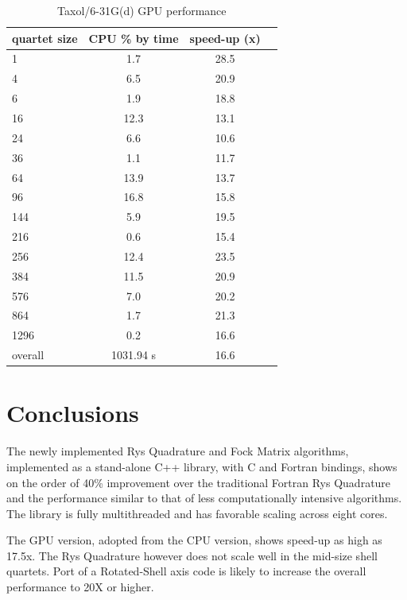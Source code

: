 \documentclass[12pt]{article}
\begin{document}
\begin{table}
  \label{results4}
  \caption {Taxol/6-31G(d) GPU performance}
  \begin{center}
    \begin{tabular}{| l | c | c | c |}
      \hline
      quartet size & CPU \% by time  &  speed-up (x) \\
      \hline
      1 & 1.7 & 28.5 \\
      4 & 6.5 & 20.9 \\
      6 & 1.9 & 18.8 \\
      16 & 12.3 & 13.1 \\
      24 & 6.6 & 10.6 \\
      36 & 1.1 & 11.7 \\
      64 & 13.9 & 13.7 \\
      96 & 16.8 & 15.8 \\
      144 & 5.9 & 19.5 \\
      216 & 0.6 & 15.4 \\
      256 & 12.4 & 23.5 \\
      384 & 11.5 & 20.9 \\
      576 & 7.0 & 20.2 \\
      864 & 1.7 & 21.3 \\
      1296 & 0.2 & 16.6 \\
      \hline
      overall & 1031.94 s &  16.6 \\
      \hline
    \end{tabular}
  \end{center}
\end{table}


\section*{Conclusions}
The newly implemented Rys Quadrature and Fock Matrix  algorithms,
implemented as a stand-alone C++ library, with C and Fortran bindings,
shows on the order of  40\% improvement over the traditional Fortran
Rys Quadrature and the performance similar to that of less
computationally intensive algorithms.  The library is fully
multithreaded and has favorable scaling across eight cores.

The GPU version, adopted from the CPU version, shows speed-up as high
as 17.5x.  The Rys Quadrature however does not scale well in the
mid-size shell quartets.  Port of a Rotated-Shell axis code is likely
to increase the overall performance to 20X or higher.



  
\end{document}

